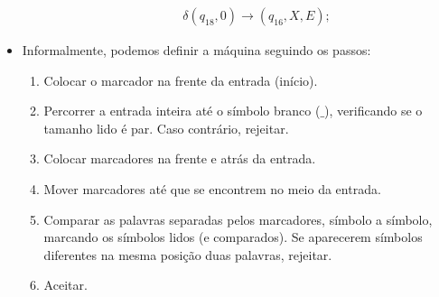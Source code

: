 \documentclass{homework}
\begin{document}
\begin{itemize}
\begin{align*}
			&\qquad \delta(q_{18},0) \rightarrow (q_{16},X,E);
		\end{align*}
		\item Informalmente, podemos definir a máquina seguindo os passos:
			\begin{enumerate}
    				\item Colocar o marcador na frente da entrada (início).
    				\item Percorrer a entrada inteira até o símbolo branco ($\_$), verificando se o tamanho lido é par. Caso contrário, rejeitar.
    				\item Colocar marcadores na frente e atrás da entrada.
    				\item Mover marcadores até que se encontrem no meio da entrada.
    				\item Comparar as palavras separadas pelos marcadores, símbolo a símbolo, marcando os símbolos lidos (e comparados). Se aparecerem símbolos diferentes na mesma posição duas palavras, rejeitar.
    				\item Aceitar.				
			\end{enumerate}


	\end{itemize}
\end{document}
